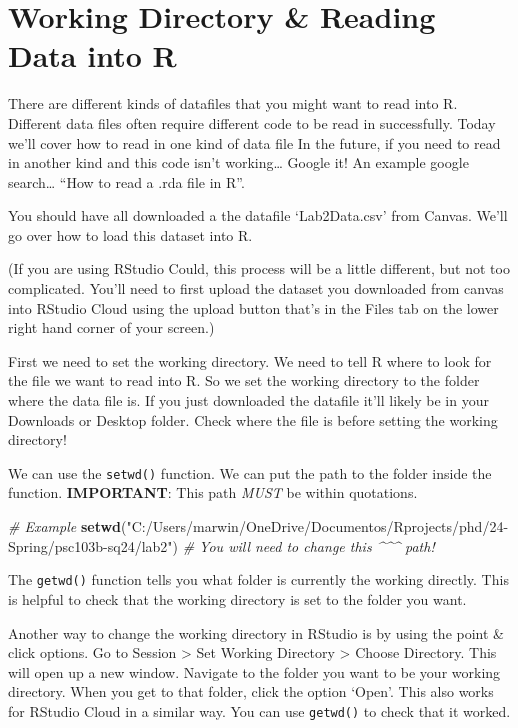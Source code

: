 \documentclass[
]{article}
\newenvironment{Shaded}{\begin{snugshade}}{\end{snugshade}}
\newcommand{\CommentTok}[1]{\textcolor[rgb]{0.56,0.35,0.01}{\textit{#1}}}
\newcommand{\FunctionTok}[1]{\textcolor[rgb]{0.13,0.29,0.53}{\textbf{#1}}}
\newcommand{\NormalTok}[1]{#1}
\newcommand{\StringTok}[1]{\textcolor[rgb]{0.31,0.60,0.02}{#1}}
\begin{document}
\hypertarget{working-directory-reading-data-into-r}{%
\section{Working Directory \& Reading Data into
R}\label{working-directory-reading-data-into-r}}

There are different kinds of datafiles that you might want to read into
R. Different data files often require different code to be read in
successfully. Today we'll cover how to read in one kind of data file In
the future, if you need to read in another kind and this code isn't
working\ldots{} Google it! An example google search\ldots{} ``How to
read a .rda file in R''.

You should have all downloaded a the datafile `Lab2Data.csv' from
Canvas. We'll go over how to load this dataset into R.

(If you are using RStudio Could, this process will be a little
different, but not too complicated. You'll need to first upload the
dataset you downloaded from canvas into RStudio Cloud using the upload
button that's in the Files tab on the lower right hand corner of your
screen.)

First we need to set the working directory. We need to tell R where to
look for the file we want to read into R. So we set the working
directory to the folder where the data file is. If you just downloaded
the datafile it'll likely be in your Downloads or Desktop folder. Check
where the file is before setting the working directory!

We can use the \texttt{setwd()} function. We can put the path to the
folder inside the function. \textbf{IMPORTANT}: This path \emph{MUST} be
within quotations.

\begin{Shaded}
\begin{Highlighting}[]
\CommentTok{\# Example}
\FunctionTok{setwd}\NormalTok{(}\StringTok{"C:/Users/marwin/OneDrive/Documentos/Rprojects/phd/24{-}Spring/psc103b{-}sq24/lab2"}\NormalTok{) }
       \CommentTok{\# You will need to change this \^{}\^{}\^{} path!}
\end{Highlighting}
\end{Shaded}

The \texttt{getwd()} function tells you what folder is currently the
working directly. This is helpful to check that the working directory is
set to the folder you want.

Another way to change the working directory in RStudio is by using the
point \& click options. Go to Session \textgreater{} Set Working
Directory \textgreater{} Choose Directory. This will open up a new
window. Navigate to the folder you want to be your working directory.
When you get to that folder, click the option `Open'. This also works
for RStudio Cloud in a similar way. You can use \texttt{getwd()} to
check that it worked.
\end{document}
